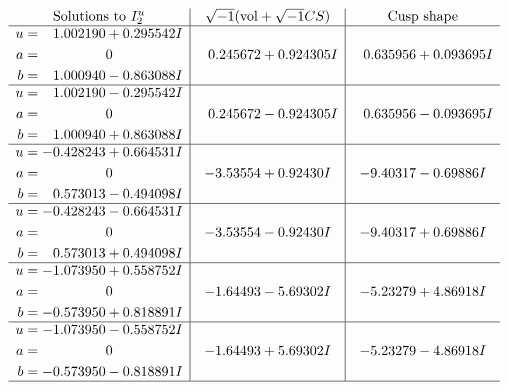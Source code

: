 \documentclass[1p]{elsarticle_modified}
\theoremstyle{definition}
\newcommand{\I}{\sqrt{-1}}
\begin{document}
$$\begin{array}{c|c|c}  
\text{Solutions to }I^u_{2}& \I (\text{vol} + \sqrt{-1}CS) & \text{Cusp shape}\\
 \hline 
\begin{aligned}
u &= \phantom{-}1.002190 + 0.295542 I \\
a &= \phantom{-0.000000 } 0 \\
b &= \phantom{-}1.000940 - 0.863088 I\end{aligned}
 & \phantom{-}0.245672 + 0.924305 I & \phantom{-}0.635956 + 0.093695 I \\ \hline\begin{aligned}
u &= \phantom{-}1.002190 - 0.295542 I \\
a &= \phantom{-0.000000 } 0 \\
b &= \phantom{-}1.000940 + 0.863088 I\end{aligned}
 & \phantom{-}0.245672 - 0.924305 I & \phantom{-}0.635956 - 0.093695 I \\ \hline\begin{aligned}
u &= -0.428243 + 0.664531 I \\
a &= \phantom{-0.000000 } 0 \\
b &= \phantom{-}0.573013 - 0.494098 I\end{aligned}
 & -3.53554 + 0.92430 I & -9.40317 - 0.69886 I \\ \hline\begin{aligned}
u &= -0.428243 - 0.664531 I \\
a &= \phantom{-0.000000 } 0 \\
b &= \phantom{-}0.573013 + 0.494098 I\end{aligned}
 & -3.53554 - 0.92430 I & -9.40317 + 0.69886 I \\ \hline\begin{aligned}
u &= -1.073950 + 0.558752 I \\
a &= \phantom{-0.000000 } 0 \\
b &= -0.573950 + 0.818891 I\end{aligned}
 & -1.64493 - 5.69302 I & -5.23279 + 4.86918 I \\ \hline\begin{aligned}
u &= -1.073950 - 0.558752 I \\
a &= \phantom{-0.000000 } 0 \\
b &= -0.573950 - 0.818891 I\end{aligned}
 & -1.64493 + 5.69302 I & -5.23279 - 4.86918 I\\
 \hline 
 \end{array}$$\newpage
\end{document}
